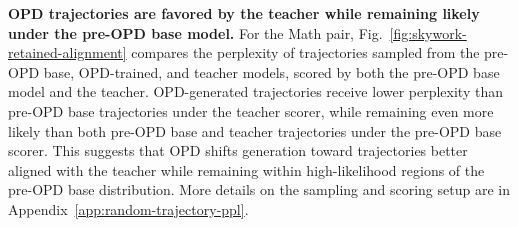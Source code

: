 \documentclass{article}
\theoremstyle{opdplain}
\begin{document}
\noindent\textbf{OPD trajectories are favored by the teacher while remaining likely under the pre-OPD base model.} For the Math pair, Fig.~\ref{fig:skywork-retained-alignment} compares the perplexity of trajectories sampled from the pre-OPD base, OPD-trained, and teacher models, scored by both the pre-OPD base model and the teacher. OPD-generated trajectories receive lower perplexity than pre-OPD base trajectories under the teacher scorer, while remaining even more likely than both pre-OPD base and teacher trajectories under the pre-OPD base scorer. This suggests that OPD shifts generation toward trajectories better aligned with the teacher while remaining within high-likelihood regions of the pre-OPD base distribution. More details on the sampling and scoring setup are in Appendix~\ref{app:random-trajectory-ppl}.
\end{document}

